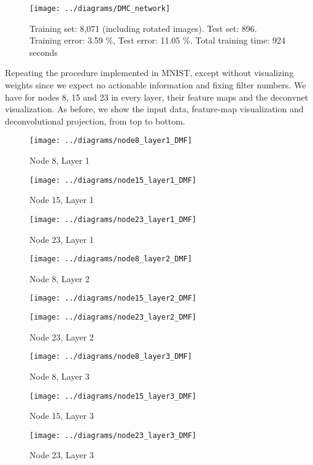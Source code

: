 \documentclass[12pt]{article}
\begin{document}
\begin{figure} [H]
\centering
\texttt{[image: ../diagrams/DMC\_network]}
\caption{Training set: 8,071 (including rotated images). Test set: 896. Training error: 3.59 \%, Test error: 11.05 \%. Total training time: 924 seconds}
\label{fig:dmcnetwork}
\end{figure}

Repeating the procedure implemented in MNIST, except without visualizing weights since we expect no actionable information and fixing filter numbers. We have for nodes 8, 15 and 23 in every layer, their feature maps and the deconvnet visualization. As before, we show the input data, feature-map visualization and deconvolutional projection, from top to bottom.

\begin{figure} [H]
	\centering
	\texttt{[image: ../diagrams/node8\_layer1\_DMF]}
	\caption{Node 8, Layer 1}
	\label{fig:node8layer1dmf}
\end{figure}
\begin{figure}[H]
	\centering
	\texttt{[image: ../diagrams/node15\_layer1\_DMF]}
	\caption{Node 15, Layer 1}
	\label{fig:node15layer1dmf}
\end{figure}
\begin{figure}[H]
	\centering
	\texttt{[image: ../diagrams/node23\_layer1\_DMF]}
	\caption{Node 23, Layer 1}
	\label{fig:node23layer1dmf}
\end{figure}
\begin{figure}[H]
	\centering
	\texttt{[image: ../diagrams/node8\_layer2\_DMF]}
	\caption{Node 8, Layer 2}
	\label{fig:node8layer2dmf}
\end{figure}
\begin{figure}
\centering
\texttt{[image: ../diagrams/node15\_layer2\_DMF]}
\caption[Node 15, Layer 2]{}
\caption{}
\label{fig:node15layer2dmf}
\end{figure}
\begin{figure}[H]
	\centering
	\texttt{[image: ../diagrams/node23\_layer2\_DMF]}
	\caption{Node 23, Layer 2}
	\label{fig:node23layer2dmf}
\end{figure}
\begin{figure}[H]
	\centering
	\texttt{[image: ../diagrams/node8\_layer3\_DMF]}
	\caption{Node 8, Layer 3}
	\label{fig:node8layer3dmf}
\end{figure}
\begin{figure}[H]
	\centering
	\texttt{[image: ../diagrams/node15\_layer3\_DMF]}
	\caption{Node 15, Layer 3}
	\label{fig:node15layer3dmf}
\end{figure}
\begin{figure}[H]
	\centering
	\texttt{[image: ../diagrams/node23\_layer3\_DMF]}
	\caption{Node 23, Layer 3}
	\label{fig:node23layer3dmf}
\end{figure}
\end{document}
